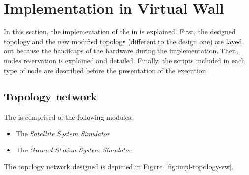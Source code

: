 
\section{Implementation in Virtual Wall}






In this section, the implementation of the \sss in \vw is explained. First, the designed
topology and the new modified topology (different to the design one) are layed out because
the handicaps of the hardware during the implementation. Then, nodes reservation is
explained and detailed. Finally, the scripts included in each type of node are described
before the presentation of the execution.





\subsection{Topology network}

The \sss is comprised of the
following modules:
\begin{itemize}
\item The \emph{Satellite System Simulator}
\item The \emph{Ground Station System Simulator}
\end{itemize}
The topology network designed is depicted in Figure~\ref{fig:impl-topology-vw}.


